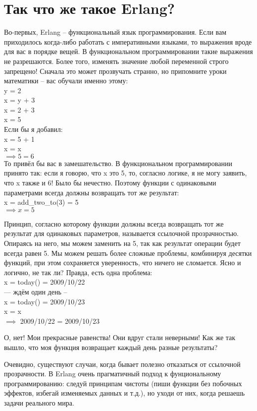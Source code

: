 \section{Так что же такое Erlang?}
Во\--первых, Erlang \--- функциональный язык программирования.
Если вам приходилось когда\--либо работать с императивными языками, то выражения вроде  для вас в порядке вещей.
В функциональном программировании такие выражения не разрешаются.
Более того, изменять значение любой переменной строго запрещено!
Сначала это может прозвучать странно, но припомните уроки математики \--- вас обучали именно этому:\\ 
y = 2\\ 
x = y + 3\\ 
x = 2 + 3\\ 
x = 5\\ 
Если бы я добавил:\\ 
x = 5 + 1\\ 
x = x\\ 
$\implies 5 = 6$\\ 

То привёл бы вас в замешательство.
В функциональном программировании принято так: если я говорю, что x это 5, то, согласно логике, я не могу заявить, что x также и 6!
Было бы нечестно.
Поэтому функции с одинаковыми параметрами всегда должны возвращать тот же результат:\\  
x = add\_two\_to(3) = 5\\ 
$\implies x = 5$
 
Принцип, согласно которому функции должны всегда возвращать тот же результат для одинаковых параметров, называется ссылочной прозрачностью.
Опираясь на него, мы можем заменить  на 5, так как результат операции  будет всегда равен 5.
Мы можем решать более сложные проблемы, комбинируя десятки функций, при этом сохраняется уверенность, что ничего не сломается.
Ясно и логично, не так ли?
Правда, есть одна проблема:\\ 
x = today() = 2009/10/22\\ 
--- ждём один день --\\ 
x = today() = 2009/10/23\\ 
x = x\\ 
$\implies$ 2009/10/22 = 2009/10/23 

О, нет!
Мои прекрасные равенства!
Они вдруг стали неверными!
Как же так вышло, что моя функция возвращает каждый день разные результаты?

Очевидно, существуют случаи, когда бывает полезно отказаться от ссылочной прозрачности.
В Erlang очень прагматичный подход к фунциональному программированию: следуй принципам чистоты (пиши функции без побочных эффектов, избегай изменяемых данных и т.д.), но уходи от них, когда решаешь задачи реального мира.

